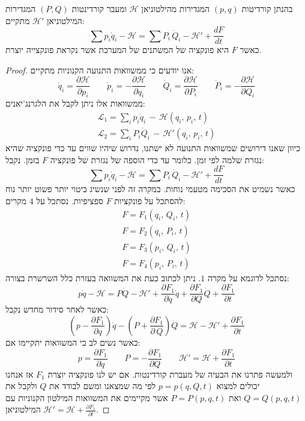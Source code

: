 \documentclass{tstextbook}
\begin{document}
\begin{theorem}
בהנתן קורדיטות \((p,q)\) המגדירות מהילטוניאן \(\mathcal{\mathcal{H}}\) ומעבר קורדינטות \((P,Q)\) המגדירות המילטוניאן \(\mathcal{H}'\) מתקיים:
$$\sum p_{i}\dot{q}_{i}-\mathcal{H}=\sum P_{i}\,\dot{Q}_{i}-\mathcal{H}'+{\frac{d F}{d t}}$$
כאשר \(F\) היא פונקציה של המשתנים של המערכת אשר נקראת פונקצייה יוצרת.

\end{theorem}
\begin{proof}
אנו יודעים כי ממשוואות התנועה הקנוניות מתקיים:
$$\dot{q}_{i}=\frac{\partial \mathcal{H}}{\partial p_{i}}\qquad \dot{p}_{i}=-\frac{\partial \mathcal{H}}{\partial q_{i}}\qquad \dot{Q}_{i}=\frac{\partial \mathcal{H}}{\partial P_{i}}\qquad \dot{P}_{i}=-\frac{\partial \mathcal{H}}{\partial Q_{i}}$$
ממשוואות אלו ניתן לקבל את הלגרנג'יאנים:
\begin{gather*}\mathcal{L} _{1}= \sum_{i}p_{i}{\dot{q}}_{i}\,-\,\mathcal{H}\left( q_{i},\,p_{i},\,t \right)\\ \mathcal{L} _{2}= \sum_{i}P_{i}{\dot{Q}}_{i}\,-\,\mathcal{H}'\left( q_{i},\,p_{i},\,t \right) 
\end{gather*}
כיוון שאנו דירושים שמשוואות התנועה לא ישתנו, נדרוש שיהיו שווים עד כדי פונקציה שהיא נגזרת שלמה לפי זמן. כלומר עד כדי הוספה של נגזרת של פונקציה \(F\) בזמן. נקבל:
$$\sum p_{i}\dot{q}_{i}-\mathcal{H}=\sum P_{i}\,\dot{Q}_{i}-\mathcal{H}'+{\frac{d F}{d t}}$$
כאשר נשמיט את הסכימה מטעמי נוחות.
במקרה זה לפני שנשיג ביטוי יותר פשוט יותר נוח להסתכל על פונקציות \(F\) ספציפיות. 
נסתכל על \(4\) מקרים:
$$\begin{array}{l}{{F=F_{1}(q_{i},\,Q_{i},\,t)}}\\ {{F=F_{2}(q_{i},\,P_{i},\,t)}}\\ {{F=F_{3}(p_{i},\,Q_{i},\,t)}}\\ {{F=F_{4}(p_{i},\,P_{i},\,t)}}\end{array}$$
נסתכל לדוגמא על מקרה \(1\). ניתן לכתוב כעת את המשוואה בעזרת כלל השרשרת בצורה:
$$p\dot{q}-\mathcal{H}=P\dot{Q}-\mathcal{H}'+{\frac{\partial F_{1}}{\partial q}}\dot{q}+{\frac{\partial F_{1}}{\partial Q}}\dot{Q}+{\frac{\partial F_{1}}{\partial t}}$$
כאשר לאחר סידור מחדש נקבל:
$$\left(p-\frac{\partial F_{1}}{\partial q}\right)\dot{q}-\left(P+\frac{\partial F_{1}}{\partial\,Q}\right)\dot{Q}=\mathcal{H}-\mathcal{H}'+\frac{\partial F_{1}}{\partial t}$$
כאשר נשים לב כי המשוואות יתקיימו אם:
$$p=\frac{\partial F_{1}}{\partial q}\qquad P=-\frac{\partial F_{1}}{\partial Q}\qquad \mathcal{H}'=\mathcal{H}+\frac{\partial F_{1}}{\partial t}$$
ולמעשה פתרנו את הבעיה של מעברת קורדינטות. אם יש לנו פונקציה יוצרת \(F_{1}\) אז אנחנו יכולים למצוא \(p=p(q,Q,t)\) לפי מה שמצאנו ומשם לבודד את \(Q\) ולקבל את \(Q=Q(p,q,t)\) ואת \(P=P(p,q,t)\) אשר מקיימים את המשוואות המילטון הקנוניות עם המילטוניאן \(\mathcal{H}'=\mathcal{H}+\frac{\partial F_{1}}{\partial t}\). 

\end{proof}
\end{document}
